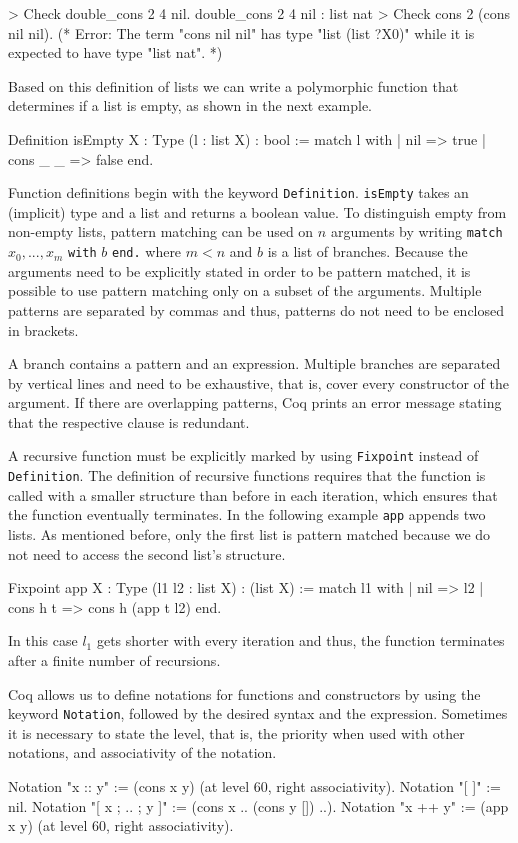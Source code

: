 \documentclass[paper = a4, fleqn, twoside]{scrreprt}
\newcommand{\coqinline}[1]{\texttt{#1}}
\begin{document}
\begin{coqcode}
> Check double_cons 2 4 nil.
double_cons 2 4 nil : list nat
> Check cons 2 (cons nil nil). 
(* Error: The term "cons nil nil" has type "list (list ?X0)"
while it is expected to have type "list nat". *)
\end{coqcode}
Based on this definition of lists we can write a polymorphic function that determines if a list is empty, as shown in the next example.
\begin{coqcode}
Definition isEmpty {X : Type} (l : list X) : bool := 
  match l with
  | nil      => true
  | cons _ _ => false
  end.
\end{coqcode}
Function definitions begin with the keyword \coqinline{Definition}. \coqinline{isEmpty} takes an (implicit) type and a list and returns a boolean value. To distinguish empty from non-empty lists, pattern matching can be used on $n$ arguments by writing \coqinline{match} $x_{0},...,x_{m}$ \coqinline{with} $b$ \coqinline{end.} where $m < n$ and $b$ is a list of branches. Because the arguments need to be explicitly stated in order to be pattern matched, it is possible to use pattern matching only on a subset of the arguments. Multiple patterns are separated by commas and thus, patterns do not need to be enclosed in brackets.
\par
A branch contains a pattern and an expression. Multiple branches are separated by vertical lines and need to be exhaustive, that is, cover every constructor of the argument. If there are overlapping patterns, Coq prints an error message stating that the respective clause is redundant.
\par
A recursive function must be explicitly marked by using \coqinline{Fixpoint} instead of \coqinline{Definition}. The definition of recursive functions requires that the function is called with a smaller structure than before in each iteration, which ensures that the function eventually terminates. In the following example \coqinline{app} appends two lists. As mentioned before, only the first list is pattern matched because we do not need to access the second list's structure.
\begin{coqcode}
Fixpoint app {X : Type} (l1 l2 : list X) : (list X) :=
  match l1 with
  | nil => l2
  | cons h t => cons h (app t l2)
  end.
\end{coqcode}
In this case $l_{1}$ gets shorter with every iteration and thus, the function terminates after a finite number of recursions. 

Coq allows us to define notations for functions and constructors by using the keyword \coqinline{Notation}, followed by the desired syntax and the expression. Sometimes it is necessary to state the level, that is, the priority when used with other notations, and associativity of the notation.
\begin{coqcode}
Notation "x :: y" := (cons x y) (at level 60, right associativity).
Notation "[ ]" := nil.
Notation "[ x ; .. ; y ]" := (cons x .. (cons y []) ..).
Notation "x ++ y" := (app x y) (at level 60, right associativity).
\end{coqcode}
\end{document}
